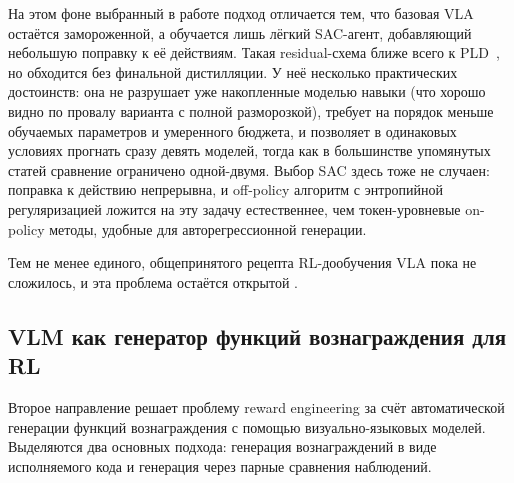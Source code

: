     На этом фоне выбранный в работе подход отличается тем, что базовая VLA остаётся замороженной, а обучается лишь лёгкий SAC-агент, добавляющий небольшую поправку к её действиям. Такая residual-схема ближе всего к PLD~\cite{pld2026}, но обходится без финальной дистилляции. У неё несколько практических достоинств: она не разрушает уже накопленные моделью навыки (что хорошо видно по провалу варианта с полной разморозкой), требует на порядок меньше обучаемых параметров и умеренного бюджета, и позволяет в одинаковых условиях прогнать сразу девять моделей, тогда как в большинстве упомянутых статей сравнение ограничено одной-двумя. Выбор SAC здесь тоже не случаен: поправка к действию непрерывна, и off-policy алгоритм с энтропийной регуляризацией ложится на эту задачу естественнее, чем токен-уровневые on-policy методы, удобные для авторегрессионной генерации.

    Тем не менее единого, общепринятого рецепта RL-дообучения VLA пока не сложилось, и эта проблема остаётся открытой \cite{reuss2025blog}.

\subsection{VLM как генератор функций вознаграждения для RL}
\label{subsec:vlm-reward}

    Второе направление решает проблему reward engineering за счёт автоматической генерации функций вознаграждения с помощью визуально-языковых моделей. Выделяются два основных подхода: генерация вознаграждений в виде исполняемого кода и генерация через парные сравнения наблюдений.

